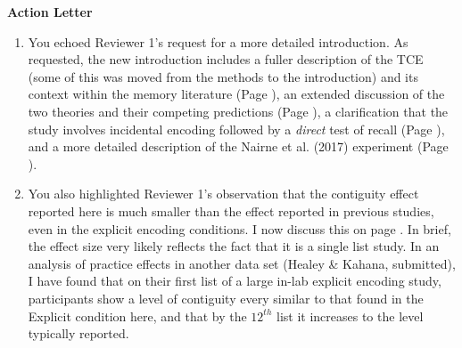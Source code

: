 \documentclass[12pt]{article}
\begin{document}
\vspace{20pt}

\textbf{\large{Action Letter}}


\begin{enumerate}

\item
	You echoed Reviewer 1's request for a more detailed introduction. As requested, the new introduction includes a fuller description of the TCE (some of this was moved from the methods to the introduction) and its context within the memory literature (Page \pageref{TODO-1}), %
	an extended discussion of the two theories and their competing predictions (Page \pageref{TODO-2}),
	a clarification that the study involves incidental encoding followed by a \emph{direct} test of recall (Page  \pageref{TODO-3}),
	and a more detailed description of the Nairne et al. (2017) experiment (Page \pageref{TODO-4}).

\item
	You also highlighted Reviewer 1's observation that the contiguity effect reported here is much smaller than the effect reported in previous studies, even in the explicit encoding conditions. I now discuss this on page \pageref{TODO-5}. In brief, the effect size very likely reflects the fact that it is a single list study. In an analysis of practice effects in another data set (Healey \& Kahana, submitted), I have found that on their first list of a large in-lab explicit encoding study, participants show a level of contiguity every similar to that found in the Explicit condition here, and that by the $12^{th}$ list it increases to the level typically reported. 


\end{enumerate}
\end{document}
